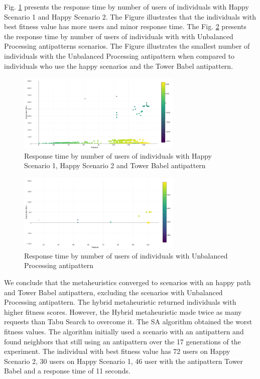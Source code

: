 \documentclass[times]{stvrauth}
\begin{document}
Fig. \ref{fig:responsetimegenerationalltests2} presents the response time by number of users of individuals with Happy Scenario 1 and Happy Scenario 2. The Figure illustrates that the individuals with best fitness value has more users and minor response time. The Fig. \ref{fig:fitnessgenerationalltests2-1} presents the response time by number of users of individuals with with Unbalanced Processing antipatterns scenarios. The Figure illustrates the smallest number of individuals with the  Unbalanced Processing antipattern when compared to individuals who use the happy scenarios and the Tower Babel antipattern.



\begin{figure}[h]
\centering
\includegraphics[width=0.7\textwidth]{./images/experiment2-5.png}
\caption{Response time by number of users of individuals with Happy Scenario 1, Happy Scenario 2 and Tower Babel antipattern}
\label{fig:responsetimegenerationalltests2}
\end{figure}


\begin{figure}[h]
\centering
\includegraphics[width=0.7\textwidth]{./images/experiment2-6.png}
\caption{Response time by number of users of individuals with Unbalanced Processing antipattern}
\label{fig:fitnessgenerationalltests2-1}
\end{figure}


We conclude that the metaheuristics converged to scenarios with an happy path and Tower Babel antipattern, excluding the scenarios with Unbalanced Processing antipattern. The hybrid metaheuristic returned individuals with higher fitness scores. However, the Hybrid metaheuristic made twice as many requests than Tabu Search to overcome it. The SA algorithm obtained the worst fitness values. The algorithm initially used a scenario with an antipattern and found neighbors that still using an antipattern over the 17 generations of the experiment. The individual with best fitness value has 72 users on Happy Scenario 2, 30 users on Happy Scenario 1, 46 user with the antipattern Tower Babel and a response time of 11 seconds.
\end{document}
